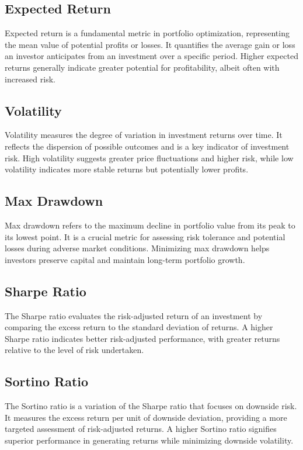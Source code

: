 \subsection{Expected Return}
Expected return is a fundamental metric in portfolio optimization, representing the mean value of potential profits or losses. It quantifies the average gain or loss an investor anticipates from an investment over a specific period. Higher expected returns generally indicate greater potential for profitability, albeit often with increased risk.

\subsection{Volatility}
Volatility measures the degree of variation in investment returns over time. It reflects the dispersion of possible outcomes and is a key indicator of investment risk. High volatility suggests greater price fluctuations and higher risk, while low volatility indicates more stable returns but potentially lower profits.

\subsection{Max Drawdown}
Max drawdown refers to the maximum decline in portfolio value from its peak to its lowest point. It is a crucial metric for assessing risk tolerance and potential losses during adverse market conditions. Minimizing max drawdown helps investors preserve capital and maintain long-term portfolio growth.

\subsection{Sharpe Ratio}
The Sharpe ratio evaluates the risk-adjusted return of an investment by comparing the excess return to the standard deviation of returns. A higher Sharpe ratio indicates better risk-adjusted performance, with greater returns relative to the level of risk undertaken.

\subsection{Sortino Ratio}
The Sortino ratio is a variation of the Sharpe ratio that focuses on downside risk. It measures the excess return per unit of downside deviation, providing a more targeted assessment of risk-adjusted returns. A higher Sortino ratio signifies superior performance in generating returns while minimizing downside volatility.

